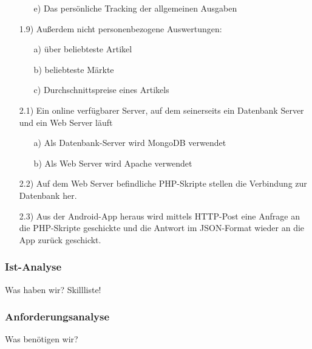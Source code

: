 \documentclass[12pt,a4paper]{article}
\begin{document}
\begin{itemize}
\begin{itemize}
\item[e)]Das persönliche Tracking der allgemeinen Ausgaben
\end{itemize}
 \item[1.9)] Außerdem nicht personenbezogene Auswertungen:
 \begin{itemize}
\item[a)]über beliebteste Artikel
\item[b)] beliebteste Märkte
\item[c)] Durchschnittspreise eines Artikels
\end{itemize}
 \item[2.1)] Ein online verfügbarer Server, auf dem seinerseits ein Datenbank Server und ein Web Server läuft
 \begin{itemize}
\item[a)]Als Datenbank-Server wird MongoDB verwendet
\item[b)]Als Web Server wird Apache verwendet
\end{itemize}
\item[2.2)] Auf dem Web Server befindliche PHP-Skripte stellen die Verbindung zur Datenbank her.
\item[2.3)] Aus der Android-App heraus wird mittels HTTP-Post eine Anfrage an die PHP-Skripte geschickte und die Antwort im JSON-Format wieder an die App zurück geschickt.
\end{itemize}
\newpage

\subsubsection{Ist-Analyse}
Was haben wir? Skillliste!
\newpage

\subsubsection{Anforderungsanalyse}
Was benötigen wir? 
\newpage
\end{document}
